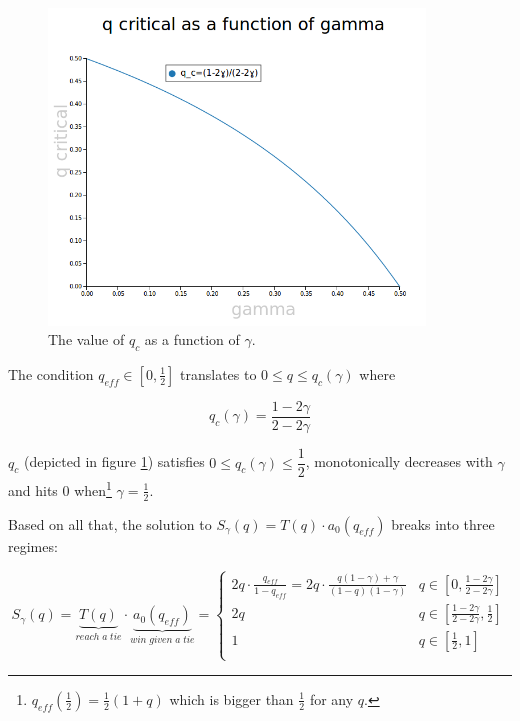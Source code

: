 \documentclass[letterpaper,12pt]{report}
\theoremstyle{plain}
\theoremstyle{definition}
\begin{document}
\begin{figure}[qcrit]
\centering
\includegraphics[width=100mm]{qcritical.png}
\caption{The value of $q_c$ as a function of $\gamma$.}
\label{fig:qcritical}
\end{figure}

The condition $q_{eff}\in [0,\frac{1}{2}]$ translates to $0\leq q\leq q_{c}(\gamma)$ where

\begin{equation}\label{qcrit}
q_{c}(\gamma)=\dfrac{1-2\gamma}{2-2\gamma}
\end{equation}

$q_c$ (depicted in figure \ref{fig:qcritical}) satisfies $0 \leq   q_{c}(\gamma) \leq\dfrac{1}{2}$, monotonically decreases with $\gamma$ and hits $0$ when\footnote{$q_{eff}(\frac{1}{2})=\frac{1}{2}(1+q)$ which is bigger than $\frac{1}{2}$ for any $q$.} $\gamma=\frac{1}{2}$.



Based on all that, the solution to $S_\gamma(q)=T(q)\cdot a_0(q_{eff})$ breaks into three regimes:

\begin{equation}\label{sofq}
S_\gamma(q)=\underbrace{T(q)}_{reach\; a\; tie}\cdot \underbrace{a_0(q_{eff})}_{win\;given\;a\;tie}=
\begin{cases}
2q\cdot\frac{q_{eff}}{1-q_{eff}}=2q\cdot\frac{q(1-\gamma)+\gamma}{(1-q)(1-\gamma)} & q\in [0,\frac{1-2\gamma}{2-2\gamma}] \\ 
2q & q\in [\frac{1-2\gamma}{2-2\gamma},\frac{1}{2}] \\ 
1 & q\in [\frac{1}{2},1] \\ 
\end{cases}
\end{equation}
\end{document}
